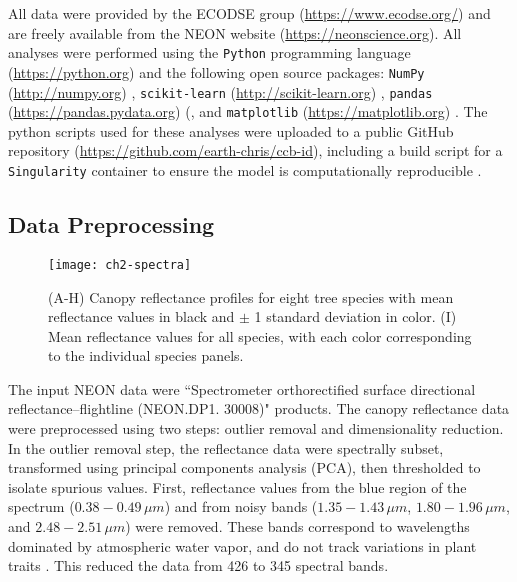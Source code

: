 All data were provided by the ECODSE group (\url{https://www.ecodse.org/}) and are freely available from the NEON website (\url{https://neonscience.org}). All analyses were performed using the \texttt{Python} programming language (\url{https://python.org}) \cite{Oliphant2007-oe} and the following open source packages: \texttt{NumPy} (\url{http://numpy.org}) \cite{Der_Walt2011-ev}, \texttt{scikit-learn} (\url{http://scikit-learn.org}) \cite{Pedregosa2011-tq}, \texttt{pandas} (\url{https://pandas.pydata.org}) (\cite{McKinney2010-jn}, and \texttt{matplotlib} (\url{https://matplotlib.org}) \cite{Hunter2007-fd}. The python scripts used for these analyses were uploaded to a public GitHub repository (\url{https://github.com/earth-chris/ccb-id}), including a build script for a \texttt{Singularity} container to ensure the model is computationally reproducible \cite{Kurtzer2017-xi}.

\subsection{Data Preprocessing}

\begin{figure}[!ht]
\texttt{[image: ch2-spectra]}
\centering
\caption[Mean reflectance signals showing high interspecific variation for eight target tree species.]{(A-H) Canopy reflectance profiles for eight tree species with mean reflectance values in black and $\pm$ 1 standard deviation in color. (I) Mean reflectance values for all species, with each color corresponding to the individual species panels.}
\label{fig:spectra}
\end{figure}

The input NEON data were ``Spectrometer orthorectified surface directional reflectance–flightline (NEON.DP1. 30008)" products. The canopy reflectance data were preprocessed using two steps: outlier removal and dimensionality reduction. In the outlier removal step, the reflectance data were spectrally subset, transformed using principal components analysis (PCA), then thresholded to isolate spurious values. First, reflectance values from the blue region of the spectrum ($0.38-0.49\, \mu m$) and from noisy bands ($1.35-1.43\, \mu m$, $1.80-1.96\, \mu m$, and $2.48-2.51\, \mu m$) were removed. These bands correspond to wavelengths dominated by atmospheric water vapor, and do not track variations in plant traits \cite{Gao2009-on}. This reduced the data from 426 to 345 spectral bands.

